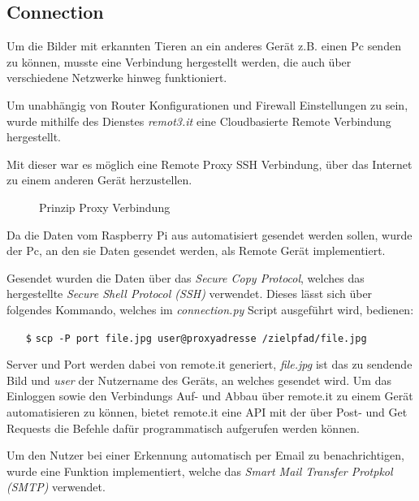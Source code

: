 \subsection*{Connection}

Um die Bilder mit erkannten Tieren an ein anderes Gerät 
z.B. einen Pc senden zu können, musste eine Verbindung
hergestellt werden, die auch über verschiedene Netzwerke 
hinweg funktioniert.

Um unabhängig von Router Konfigurationen und Firewall 
Einstellungen zu sein, wurde mithilfe des
Dienstes \textit{remot3.it} \cite{remoteit}
eine Cloudbasierte Remote Verbindung hergestellt.

Mit dieser war es möglich eine Remote Proxy SSH Verbindung, 
über das Internet zu einem anderen Gerät herzustellen.

\begin{figure}[H]
    \centering
    \def\svgwidth{0.7\textwidth}
    
    \caption{Prinzip Proxy Verbindung}
    \label{fig:remoteit}
\end{figure}

Da die Daten vom Raspberry Pi aus automatisiert gesendet 
werden sollen, wurde der Pc, an den 
sie Daten gesendet werden, als Remote Gerät implementiert.

Gesendet wurden die Daten über das \textit{Secure Copy Protocol},
welches das hergestellte \textit{Secure Shell Protocol (SSH)}
verwendet.
Dieses lässt sich über folgendes Kommando,
welches im \textit{connection.py}
Script ausgeführt wird, bedienen:
\begin{itemize}
    \item[\texttt{\$}] \texttt{scp -P port file.jpg 
    user@proxyadresse /zielpfad/file.jpg}
\end{itemize}

Server und Port werden dabei von remote.it
generiert, \textit{file.jpg} ist das zu sendende Bild und
\textit{user} der Nutzername des Geräts,
an welches gesendet wird.
Um das Einloggen sowie den Verbindungs Auf- und Abbau 
über remote.it zu einem Gerät automatisieren zu können,
bietet remote.it eine API mit der über Post- und Get Requests
die Befehle dafür programmatisch aufgerufen werden können.

Um den Nutzer bei einer Erkennung automatisch 
per Email zu benachrichtigen, wurde 
eine Funktion implementiert, welche das 
\textit{Smart Mail Transfer Protpkol (SMTP)} 
verwendet.
